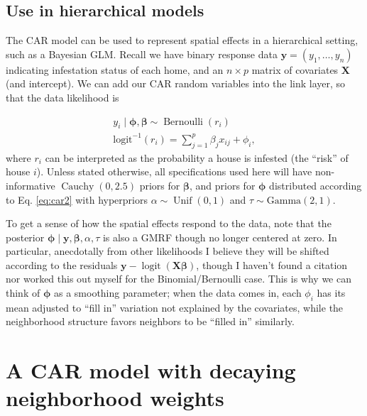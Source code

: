 \documentclass{scrartcl}
\DeclareMathOperator*{\unif}{Unif}
\DeclareMathOperator*{\bern}{Bernoulli}
\DeclareMathOperator*{\cauchy}{Cauchy}
\DeclareMathOperator*{\logit}{logit}
\newcommand{\mat}[1]{\bm{#1}}
\begin{document}
\subsection{Use in hierarchical models}
\label{sec:use-hier-models}

The CAR model can be used to represent spatial effects in a
hierarchical setting, such as a Bayesian GLM. Recall we have binary
response data $\mat{y} = (y_1,\dots, y_n)$ indicating infestation
status of each home, and an $n \times p$ matrix of covariates
$\mat{X}$ (and intercept). We can add our CAR random variables into
the link layer, so that the data likelihood is

\begin{gather}
  \label{eq:car-glm}
  y_i \mid \mat{\phi}, \mat{\beta} \sim \bern{(r_i)}\\
  \text{logit}^{-1}(r_i) = \sum_{j = 1}^p \beta_j x_{ij} + \phi_i,
\end{gather}
where $r_i$ can be interpreted as the probability a house is infested
(the ``risk'' of house $i$). Unless stated otherwise, all
specifications used here will have non-informative $\cauchy(0, 2.5)$
priors for $\mat{\beta}$, and priors for $\mat{\phi}$ distributed
according to Eq. \eqref{eq:car2} with hyperpriors
$\alpha \sim \unif(0, 1)$ and $\tau \sim \text{Gamma}(2, 1)$.

To get a sense of how the spatial effects respond to the data, note
that the posterior
$\mat{\phi} \mid \mat{y}, \mat{\beta}, \alpha, \tau$ is also a GMRF
though no longer centered at zero. In particular, anecdotally from
other likelihoods I believe they will be shifted according to the
residuals $\mat{y} - \logit(\mat{X} \mat{\beta})$, though I haven't
found a citation nor worked this out myself for the Binomial/Bernoulli
case. This is why we can think of $\mat{\phi}$ as a smoothing
parameter; when the data comes in, each $\phi_i$ has its mean adjusted
to ``fill in'' variation not explained by the covariates, while the
neighborhood structure favors neighbors to be ``filled in'' similarly.


\section{A CAR model with decaying neighborhood weights}
\label{sec:decaying-weights-car}
\end{document}
